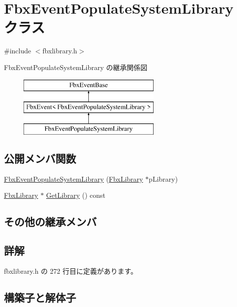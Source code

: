 \hypertarget{class_fbx_event_populate_system_library}{}\section{Fbx\+Event\+Populate\+System\+Library クラス}
\label{class_fbx_event_populate_system_library}


{\ttfamily \#include $<$fbxlibrary.\+h$>$}

Fbx\+Event\+Populate\+System\+Library の継承関係図\begin{figure}[H]
\begin{center}
\leavevmode
\includegraphics[height=3.000000cm]{class_fbx_event_populate_system_library}
\end{center}
\end{figure}
\subsection*{公開メンバ関数}
\begin{DoxyCompactItemize}
\item 
\hyperlink{class_fbx_event_populate_system_library_a0fc24725b0cdb572a82e40825b37156b}{Fbx\+Event\+Populate\+System\+Library} (\hyperlink{class_fbx_library}{Fbx\+Library} $\ast$p\+Library)
\item 
\hyperlink{class_fbx_library}{Fbx\+Library} $\ast$ \hyperlink{class_fbx_event_populate_system_library_a9916adf51d1fed8a4c6aeb8f12587ce0}{Get\+Library} () const
\end{DoxyCompactItemize}
\subsection*{その他の継承メンバ}


\subsection{詳解}


 fbxlibrary.\+h の 272 行目に定義があります。



\subsection{構築子と解体子}
\mbox{\label{class_fbx_event_populate_system_library_a0fc24725b0cdb572a82e40825b37156b}} 
